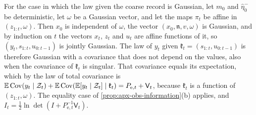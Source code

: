 \begin{remark}
For the case in which the law given the coarse record is Gaussian, let $m_0$ and $\hat\eta^-_0$ be deterministic, let $\omega$ be a Gaussian vector, and let the maps $\pi_t$ be affine in $(z_{1:t},\omega)$. Then $x_0$ is independent of $\omega$, the vector $(x_0,\mathfrak n,v,\omega)$ is Gaussian, and by induction on $t$ the vectors $x_t$, $z_t$ and $u_t$ are affine functions of it, so $(y_t,s_{1:t},u_{0:t-1})$ is jointly Gaussian. The law of $y_t$ given $\mathfrak k_t=(s_{1:t},u_{0:t-1})$ is therefore Gaussian with a covariance that does not depend on the values, also when the covariance of $\mathfrak k_t$ is singular. That covariance equals its expectation, which by the law of total covariance is $\mathbb{E}\operatorname{Cov}(y_t\mid\mathcal Z_t)+\mathbb{E}\operatorname{Cov}(\mathbb{E}[y_t\mid\mathcal Z_t]\mid\mathfrak k_t)=P_{\mathrm e,t}+\mathsf V_t$, because $\mathfrak k_t$ is a function of $(z_{1:t},\omega)$. The equality case of \cref{prop:apx-obs-information}(b) applies, and $I_t=\frac12\ln\det(I+P_{\mathrm e,t}^{-1}\mathsf V_t)$.
\end{remark}

